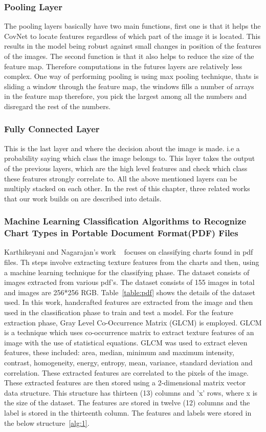 \documentclass[12pt, a4paper,oneside]{report}
\begin{document}
\subsubsection{Pooling Layer}
The pooling layers basically have two main functions, first one is that it helps the CovNet to locate features regardless of which part of the image it is located. This results in the model being robust against small changes in position of the features of the images. The second function is that it also helps to reduce the size of the feature map. Therefore computations in the futures layers are relatively less complex. One way of performing pooling is using max pooling technique, thats is sliding a window through the feature map, the windows fills a number of arrays in the feature map therefore, you pick the largest among all the numbers and disregard the rest of the numbers. 

\subsubsection{Fully Connected Layer}
This is the last layer and where the decision about the image is made. i.e a probability saying which class the image belongs to. This layer takes the output of the previous layers, which are the high level features and check which class these features strongly correlate to. All the above mentioned layers can be multiply stacked 
on each other.
In the rest of this chapter, three related works that our work builds on are described into details.  

\subsubsection{Machine Learning Classification Algorithms to Recognize Chart Types in Portable Document Format(PDF) Files}
Karthikeyani and Nagarajan's work ~\cite{karthikeyani2012machine} focuses on classifying charts found in pdf files. Th steps involve extracting texture features from the charts and then, using a machine learning technique for the classifying phase.
The dataset consists of images extracted from various pdf's. The dataset consists of 155 images in total and  images are 256*256 RGB. Table~\ref{table:pdf} shows the details of the dataset used. In this work, handcrafted features are extracted from the image and then used in the classification phase to train and test a model.
For the feature extraction phase, Gray Level Co-Occurrence Matrix (GLCM) is employed. GLCM is a technique which uses co-occurrence matrix to extract texture features of an image with the use of statistical equations. GLCM was used to extract eleven features, these included: area, median, minimum and maximum intensity, contrast, homogeneity, energy, entropy, mean, variance, standard deviation and correlation. These extracted features are correlated to the pixels of the image. These extracted features are then stored using a 2-dimensional matrix vector data structure. This structure has thirteen (13) columns and 'x' rows, where x is the size of the dataset. The features are stored in twelve (12) columns and the label is stored in the thirteenth column. The features and labels were stored in the below structure~\ref{alg:1}.
\end{document}
